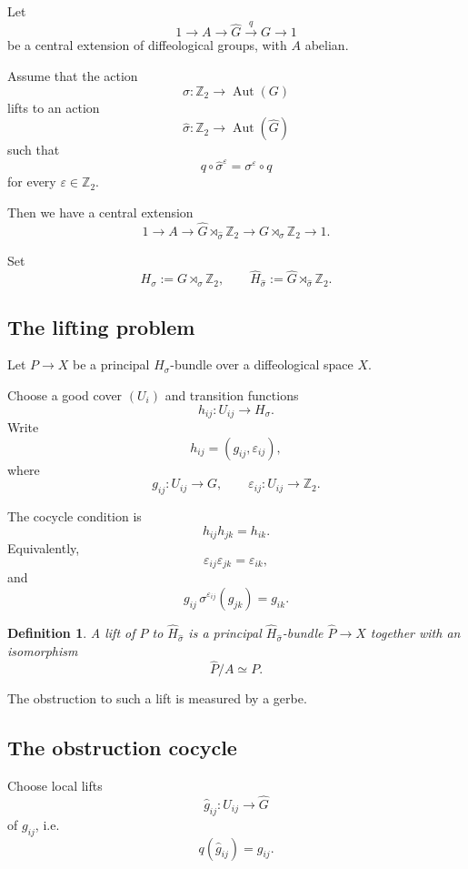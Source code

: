 \documentclass[11pt]{amsart}
\newtheorem{definition}{Definition}[section]
\begin{document}
Let
\[
1\longrightarrow A \longrightarrow \widehat G
\stackrel{q}{\longrightarrow} G \longrightarrow 1
\]
be a central extension of diffeological groups, with \(A\) abelian.

Assume that the action
\[
\sigma:\mathbb Z_2\longrightarrow \operatorname{Aut}(G)
\]
lifts to an action
\[
\widehat\sigma:\mathbb Z_2\longrightarrow \operatorname{Aut}(\widehat G)
\]
such that
\[
q\circ \widehat\sigma^\varepsilon
=
\sigma^\varepsilon\circ q
\]
for every \(\varepsilon\in\mathbb Z_2\).

Then we have a central extension
\[
1\longrightarrow A
\longrightarrow
\widehat G\rtimes_{\widehat\sigma}\mathbb Z_2
\longrightarrow
G\rtimes_\sigma \mathbb Z_2
\longrightarrow 1.
\]

Set
\[
H_\sigma:=G\rtimes_\sigma\mathbb Z_2,
\qquad
\widehat H_{\widehat\sigma}:=\widehat G\rtimes_{\widehat\sigma}\mathbb Z_2.
\]

\subsection{The lifting problem}

Let \(P\to X\) be a principal \(H_\sigma\)-bundle over a diffeological space \(X\).

Choose a good cover \((U_i)\) and transition functions
\[
h_{ij}:U_{ij}\to H_\sigma.
\]
Write
\[
h_{ij}=(g_{ij},\varepsilon_{ij}),
\]
where
\[
g_{ij}:U_{ij}\to G,
\qquad
\varepsilon_{ij}:U_{ij}\to\mathbb Z_2.
\]

The cocycle condition is
\[
h_{ij}h_{jk}=h_{ik}.
\]
Equivalently,
\[
\varepsilon_{ij}\varepsilon_{jk}=\varepsilon_{ik},
\]
and
\[
g_{ij}\,\sigma^{\varepsilon_{ij}}(g_{jk})=g_{ik}.
\]

\begin{definition}
A lift of \(P\) to \(\widehat H_{\widehat\sigma}\) is a principal
\(\widehat H_{\widehat\sigma}\)-bundle \(\widehat P\to X\) together with an isomorphism
\[
\widehat P/A \simeq P.
\]
\end{definition}

The obstruction to such a lift is measured by a gerbe.

\subsection{The obstruction cocycle}

Choose local lifts
\[
\widehat g_{ij}:U_{ij}\to \widehat G
\]
of \(g_{ij}\), i.e.
\[
q(\widehat g_{ij})=g_{ij}.
\]
\end{document}
